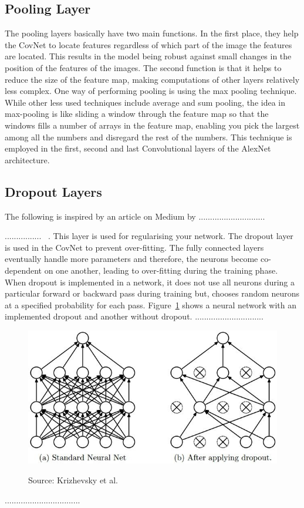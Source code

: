 \documentclass[12pt, a4paper,oneside]{report}
\newcommand{\source}[1]{\vspace{-3pt} \caption*{ Source: {#1}} }
\begin{document}
\subsection{Pooling Layer}
The pooling layers basically have two main functions. In the first place, they help the CovNet to locate features regardless of which part of the image the features are located. This results in the model being robust against small changes in the position of the features of the images. The second function is that it helps to reduce the size of the feature map, making computations of other layers relatively less complex. One way of performing pooling is using the max pooling technique. While other less used techniques include average and sum pooling, the idea in max-pooling is like sliding a window through the feature map so that the windows fills a number of arrays in the feature map, enabling you pick the largest among all the numbers and disregard the rest of the numbers. This technique is employed in the first, second and last Convolutional layers of the AlexNet architecture.

\subsection{Dropout Layers}
The following is inspired by an article on Medium by .............................

................
~\cite{dropout}. This layer is used for regularising your network. The dropout layer is used in the CovNet to prevent over-fitting. The fully connected layers eventually handle more parameters and therefore, the neurons become co-dependent on one another, leading to over-fitting during the training phase. When dropout is implemented in a network, it does not use all neurons during a particular forward or backward pass during training but, chooses random neurons at a specified probability for each pass. Figure~\ref{fig:dropout} shows a neural network with an implemented dropout and another without dropout.
..............................
\begin{figure}[!htb]
	\includegraphics [scale=0.6] {dropout}
	\label{fig:dropout}
	\source{Krizhevsky et al.~\cite{srivastava2014dropout}}
\end{figure}
.................................
\end{document}
